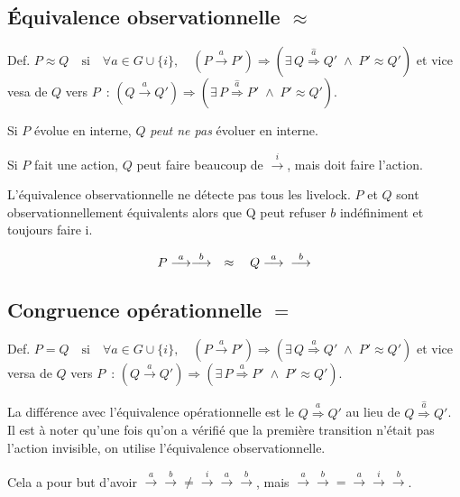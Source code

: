 \documentclass[a4paper,french,9pt]{article}
\def\GUi{G \cup \{i\}}
\def\transition#1{\stackrel{#1}{\longrightarrow}}
\def\Transition#1{\stackrel{#1}{\Longrightarrow}}
\def\observationnelle{\approx}
\def\si{\quad\text{si}\quad}
\begin{document}
\subsection{Équivalence observationnelle $\observationnelle$}

Def. $P \observationnelle Q\si \forall a \in \GUi,\quad \left(P\transition{a}P'\right) \Rightarrow \left(\exists\,
  Q\Transition{\hat{a}}Q' \;\wedge\; P' \observationnelle Q'\right)$ et vice vesa de $Q$ vers $P$~: $\left(Q\transition{a}Q'\right)
\Rightarrow \left(\exists\, P\Transition{\hat{a}}P' \;\wedge\; P' \observationnelle Q'\right)$.

Si $P$ évolue en interne, $Q$ \emph{peut ne pas} évoluer en interne.

Si $P$ fait une action, $Q$ peut faire beaucoup de $\transition{i}$, mais doit faire l'action.

L'équivalence observationnelle ne détecte pas tous les livelock. $P$ et $Q$ sont observationnellement équivalents alors que Q peut refuser
$b$ indéfiniment et toujours faire i.

$$P\transition{a}\transition{b} \quad\observationnelle\quad Q\transition{a}\tikz[remember picture]{\node[coordinate] (ab) {};}\transition{b}$$

\subsection{Congruence opérationnelle $=$}

Def. $P=Q \si \forall a \in \GUi,\quad \left(P\transition{a}P'\right) \Rightarrow \left(\exists\, Q\Transition{a}Q'
  \;\wedge\; P' \observationnelle Q'\right)$ et vice versa de $Q$ vers $P$~: $\left(Q\transition{a}Q'\right) \Rightarrow \left(\exists\,
  P\Transition{a}P' \;\wedge\; P' \observationnelle Q'\right)$.

La différence avec l'équivalence opérationnelle est le $Q\Transition{a}Q'$ au lieu de $Q\Transition{\hat{a}}Q'$. Il est à noter qu'une fois
qu'on a vérifié que la première transition n'était pas l'action invisible, on utilise l'équivalence observationnelle.

Cela a pour but d'avoir $\transition{a}\transition{b}\neq\transition{i}\transition{a}\transition{b}$, mais
$\transition{a}\transition{b}=\transition{a}\transition{i}\transition{b}$.
\end{document}
